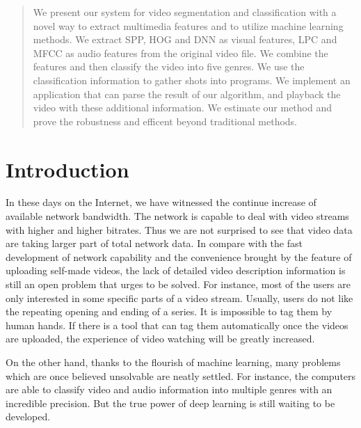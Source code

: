 \documentclass{article}
\begin{document}
 


\begin{abstract} 
We present our system for video segmentation and classification with a novel way to extract multimedia features and to utilize machine learning methods. We extract SPP, HOG and DNN as visual features, LPC and MFCC as audio features from the original video file. We combine the features and then classify the video into five genres. We use the classification information to gather shots into programs. We implement an application that can parse the result of our algorithm, and playback the video with these additional information. We estimate our method and prove the robustness and efficent beyond traditional methods. 
\end{abstract} 

\section{Introduction}

In these days on the Internet, we have witnessed the continue increase of available network bandwidth. The network is capable to deal with video streams with higher and higher bitrates. Thus we are not surprised to see that video data are taking larger part of total network data. In compare with the fast development of network capability and the convenience brought by the feature of uploading self-made videos, the lack of detailed video description information is still an open problem that urges to be solved. For instance, most of the users are only interested in some specific parts of a video stream. Usually, users do not like the repeating opening and ending of a series. It is impossible to tag them by human hands. If there is a tool that can tag them automatically once the videos are uploaded, the experience of video watching will be greatly increased.

On the other hand, thanks to the flourish of machine learning, many problems which are once believed unsolvable are neatly settled. For instance, the computers are able to classify video and audio information into multiple genres with an incredible precision. But the true power of deep learning is still waiting to be developed.
\end{document}
